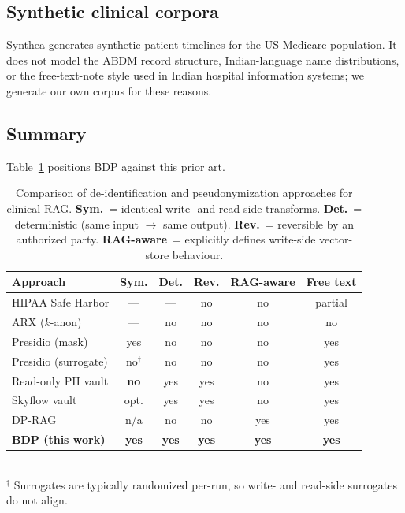 \documentclass[11pt,a4paper]{article}
\begin{document}
\subsection{Synthetic clinical corpora}

Synthea \cite{walonoski2018synthea} generates synthetic patient timelines
for the US Medicare population. It does not model the ABDM record
structure, Indian-language name distributions, or the free-text-note
style used in Indian hospital information systems; we generate our own
corpus for these reasons.

\subsection{Summary}

Table~\ref{tab:related} positions BDP against this prior art.

\begin{table}[t]
\centering
\caption{Comparison of de-identification and pseudonymization approaches
for clinical RAG. \textbf{Sym.}\ = identical write- and read-side
transforms. \textbf{Det.}\ = deterministic (same input $\rightarrow$ same
output). \textbf{Rev.}\ = reversible by an authorized party.
\textbf{RAG-aware}\ = explicitly defines write-side vector-store behaviour.}
\label{tab:related}
\small
\begin{tabular}{lccccc}
\toprule
Approach & Sym. & Det. & Rev. & RAG-aware & Free text \\
\midrule
HIPAA Safe Harbor   & ---  & ---  & no   & no  & partial \\
ARX ($k$-anon)      & ---  & no   & no   & no  & no  \\
Presidio (mask)     & yes  & no   & no   & no  & yes \\
Presidio (surrogate)& no$^\dagger$ & no & no & no & yes \\
Read-only PII vault & \textbf{no}  & yes  & yes  & no  & yes \\
Skyflow vault       & opt. & yes  & yes  & no  & yes \\
DP-RAG              & n/a  & no   & no   & yes & yes \\
\textbf{BDP (this work)} & \textbf{yes} & \textbf{yes} & \textbf{yes} & \textbf{yes} & \textbf{yes} \\
\bottomrule
\end{tabular}
\\[0.4em]
{\footnotesize $^\dagger$ Surrogates are typically randomized per-run, so
write- and read-side surrogates do not align.}
\end{table}
\end{document}

